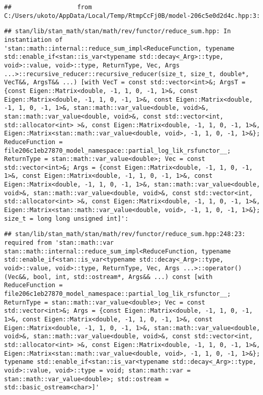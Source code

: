 \documentclass[
]{article}
\begin{document}
\begin{verbatim}
##                  from C:/Users/ukoto/AppData/Local/Temp/RtmpCcFj0B/model-206c5e0d2d4c.hpp:3:
\end{verbatim}

\begin{verbatim}
## stan/lib/stan_math/stan/math/rev/functor/reduce_sum.hpp: In instantiation of 'stan::math::internal::reduce_sum_impl<ReduceFunction, typename std::enable_if<stan::is_var<typename std::decay<_Arg>::type, void>::value, void>::type, ReturnType, Vec, Args ...>::recursive_reducer::recursive_reducer(size_t, size_t, double*, VecT&&, ArgsT&& ...) [with VecT = const std::vector<int>&; ArgsT = {const Eigen::Matrix<double, -1, 1, 0, -1, 1>&, const Eigen::Matrix<double, -1, 1, 0, -1, 1>&, const Eigen::Matrix<double, -1, 1, 0, -1, 1>&, stan::math::var_value<double, void>&, stan::math::var_value<double, void>&, const std::vector<int, std::allocator<int> >&, const Eigen::Matrix<double, -1, 1, 0, -1, 1>&, Eigen::Matrix<stan::math::var_value<double, void>, -1, 1, 0, -1, 1>&}; ReduceFunction = file206c1eb27870_model_namespace::partial_log_lik_rsfunctor__; ReturnType = stan::math::var_value<double>; Vec = const std::vector<int>&; Args = {const Eigen::Matrix<double, -1, 1, 0, -1, 1>&, const Eigen::Matrix<double, -1, 1, 0, -1, 1>&, const Eigen::Matrix<double, -1, 1, 0, -1, 1>&, stan::math::var_value<double, void>&, stan::math::var_value<double, void>&, const std::vector<int, std::allocator<int> >&, const Eigen::Matrix<double, -1, 1, 0, -1, 1>&, Eigen::Matrix<stan::math::var_value<double, void>, -1, 1, 0, -1, 1>&}; size_t = long long unsigned int]':
\end{verbatim}

\begin{verbatim}
## stan/lib/stan_math/stan/math/rev/functor/reduce_sum.hpp:248:23:   required from 'stan::math::var stan::math::internal::reduce_sum_impl<ReduceFunction, typename std::enable_if<stan::is_var<typename std::decay<_Arg>::type, void>::value, void>::type, ReturnType, Vec, Args ...>::operator()(Vec&&, bool, int, std::ostream*, Args&& ...) const [with ReduceFunction = file206c1eb27870_model_namespace::partial_log_lik_rsfunctor__; ReturnType = stan::math::var_value<double>; Vec = const std::vector<int>&; Args = {const Eigen::Matrix<double, -1, 1, 0, -1, 1>&, const Eigen::Matrix<double, -1, 1, 0, -1, 1>&, const Eigen::Matrix<double, -1, 1, 0, -1, 1>&, stan::math::var_value<double, void>&, stan::math::var_value<double, void>&, const std::vector<int, std::allocator<int> >&, const Eigen::Matrix<double, -1, 1, 0, -1, 1>&, Eigen::Matrix<stan::math::var_value<double, void>, -1, 1, 0, -1, 1>&}; typename std::enable_if<stan::is_var<typename std::decay<_Arg>::type, void>::value, void>::type = void; stan::math::var = stan::math::var_value<double>; std::ostream = std::basic_ostream<char>]'
\end{verbatim}
\end{document}
